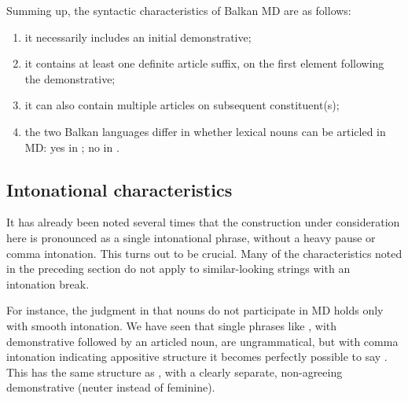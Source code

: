 \documentclass[output=paper]{langscibook}
\begin{document}
\noindent Summing up, the syntactic characteristics of Balkan  MD are as follows:
\begin{enumerate}
\item it necessarily includes an initial demonstrative;
\item it  contains at least one definite article suffix, on the first element following the demonstrative;
\item it can also contain multiple articles on subsequent constituent(s);
\item the two Balkan  languages differ in whether lexical nouns can be articled in MD: yes in ; no in .
\end{enumerate}

\subsection{Intonational characteristics} \label{sec:rudin:intonation}

It has already been noted several times that the construction under consideration here is pronounced as a single intonational phrase, without a heavy pause or comma intonation. This turns out to be crucial. Many of the characteristics noted in the preceding section do not apply to similar-looking strings with an intonation break.

For instance, the judgment in  that nouns do not participate in MD holds only with smooth intonation. We have seen that single phrases like , with demonstrative followed by an articled noun, are ungrammatical, but with comma intonation indicating appositive structure it becomes perfectly possible to say . This has the same structure as , with a clearly separate, non-agreeing demonstrative (neuter instead of feminine).

\z

\end{document}
